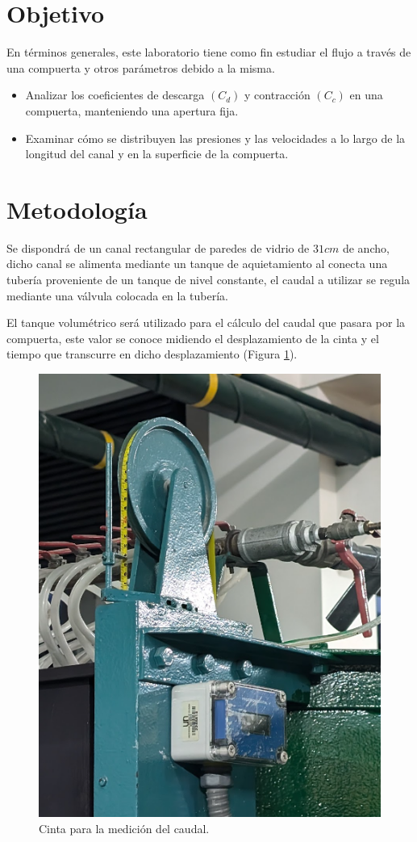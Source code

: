 \documentclass[10pt, a4paper]{exam}
\begin{document}
\section{Objetivo}

En términos generales, este laboratorio tiene como fin estudiar el flujo a través de una compuerta y otros parámetros debido a la misma.

\begin{itemize}

    \item Analizar los coeficientes de descarga $(C_d)$ y contracción $(C_c)$ en una compuerta, manteniendo una apertura fija.
    
    \item Examinar cómo se distribuyen las presiones y las velocidades a lo largo de la longitud del canal y en la superficie de la compuerta.
    
\end{itemize}


\section{Metodología}

Se dispondrá de un canal rectangular de paredes de vidrio de $31cm$ de ancho, dicho canal se alimenta mediante un tanque de aquietamiento al conecta una tubería proveniente de un tanque de nivel constante, el caudal a utilizar se regula mediante una válvula colocada en la tubería. \vspace{1ex}

El tanque volumétrico será utilizado para el cálculo del caudal que pasara por la compuerta, este valor se conoce midiendo el desplazamiento de la cinta y el tiempo que transcurre en dicho desplazamiento (Figura \ref{fig:cinta}). 


\begin{figure}[h]
    \centering
    \includegraphics[width=0.29\linewidth]{Images/cinta.png}
    \caption{Cinta para la medición del caudal.}
    \label{fig:cinta}
\end{figure}
\end{document}

